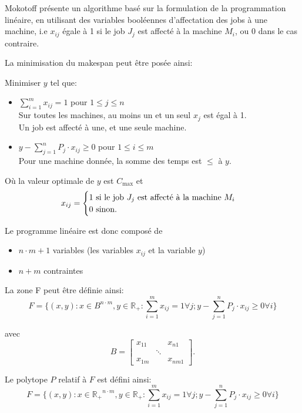\documentclass[a4paper,12pt]{report}
\theoremstyle{plain}				%
\theoremstyle{definition}				%
\newcommand{\tdi}[1]{\todo[inline]{{#1}}{}}
\newcommand{\lp}[1]{\todo[author=LP,color=yellow,inline]{#1}}
\begin{document}
Mokotoff \cite{mokoto1999scheduling} présente un algorithme basé sur
la formulation de la programmation linéaire, en utilisant des
variables booléennes d'affectation des jobs à une machine, i.e $x_{ij}$ égale à 1 si le job $J_j$ est affecté à la machine $M_i$, ou 0 dans le cas contraire.

\lp{définir $x_{ij}$}
\tdi{FCO: ok, fait}
\bigskip
La minimisation du makespan peut être posée ainsi:

Minimiser $y$ tel que:

\begin{itemize}
\item $\sum_{i=1}^{m}x_{ij}=1$ \quad pour $1 \leq j \leq n$ 		\\
Sur toutes les machines, au moins un et un seul $x_j$ est égal à 1.	\\
Un job est affecté à une, et une seule machine.

\item $y-\sum_{j=1}^{n}P_j \cdot x_{ij} \geq 0$ \quad pour $1 \leq i \leq m$ \\
Pour une machine donnée, la somme des temps est $\leq$ à $y$.
\end{itemize}

\bigskip
Où la valeur optimale de $y$ est $C_{\max}$
et
\[
  x_{ij} =
  \begin{cases}
    1 \textnormal{ si le job $J_j$ est affecté à la machine $M_i$}\\
    0 \textnormal{ sinon.}\\
  \end{cases}
\]

Le programme linéaire est donc composé de
\begin{itemize}
\item $n \cdot m + 1$ variables (les variables $x_{ij}$ et la variable $y$)
\item $n+m$ contraintes
\end{itemize}

La zone F peut être définie ainsi:
\[
  F=\{ (x,y) : x \in B^{n \cdot m}, y \in \mathbb{R_+} : \sum_{i=1}^{m} x_{ij}=1 \forall j;
y-\sum_{j=1}^{n} P_j \cdot x_{ij} \geq 0 \forall i \}
\]

avec
\[
B=\begin{bmatrix}
x_{11}& &x_{n1}\\
& \ddots & \\
x_{1m}& &x_{nm1}
\end{bmatrix}.
\]

Le polytope $P$ relatif à $F$ est défini ainsi:
\[
  F=\{ (x,y) : x \in \mathbb{R_+}^{n \cdot m}, y \in \mathbb{R_+} : \sum_{i=1}^{m} x_{ij}=1 \forall j;
  y-\sum_{j=1}^{n} P_j \cdot x_{ij} \geq 0 \forall i	\}
\]
\end{document}
